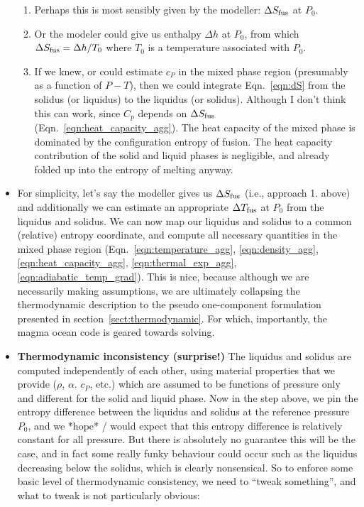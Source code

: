 \begin{itemize}
\begin{enumerate}
\item Perhaps this is most sensibly given by the modeller: $\Delta S_{\rm fus}$ at $P_0$.
\item Or the modeler could give us enthalpy $\Delta h$ at $P_0$, from which $\Delta S_{\rm fus} = \Delta h / T_0$ where $T_0$ is a temperature associated with $P_0$.
\item If we knew, or could estimate $c_P$ in the mixed phase region (presumably as a function of $P-T$), then we could integrate Eqn.~\ref{eqn:dS} from the solidus (or liquidus) to the liquidus (or solidus).  Although I don't think this can work, since $C_p$ depends on $\Delta S_{\rm fus}$ (Eqn.~\ref{eqn:heat_capacity_agg}).  The heat capacity of the mixed phase is dominated by the configuration entropy of fusion. The heat capacity contribution of the solid and liquid phases is negligible, and already folded up into the entropy of melting anyway.
\end{enumerate}
\item For simplicity, let's say the modeller gives us $\Delta S_{\rm fus}$ (i.e., approach 1. above) and additionally we can estimate an appropriate $\Delta T_{\rm fus}$ at $P_0$ from the liquidus and solidus.  We can now map our liquidus and solidus to a common (relative) entropy coordinate, and compute all necessary quantities in the mixed phase region (Eqn.~\ref{eqn:temperature_agg}, \ref{eqn:density_agg}, \ref{eqn:heat_capacity_agg}, \ref{eqn:thermal_exp_agg}, \ref{eqn:adiabatic_temp_grad}).  This is nice, because although we are necessarily making assumptions, we are ultimately collapsing the thermodynamic description to the pseudo one-component formulation presented in section~\ref{sect:thermodynamic}.  For which, importantly, the magma ocean code is geared towards solving.
\item \textbf{Thermodynamic inconsistency (surprise!)}
  The liquidus and solidus are computed independently of each other, using material properties that we provide ($\rho$, $\alpha$. $c_P$, etc.) which are assumed to be functions of pressure only and different for the solid and liquid phase.  Now in the step above, we pin the entropy difference between the liquidus and solidus at the reference pressure $P_0$, and we *hope* / would expect that this entropy difference is relatively constant for all pressure.  But there is absolutely no guarantee this will be the case, and in fact some really funky behaviour could occur such as the liquidus decreasing below the solidus, which is clearly nonsensical.  So to enforce some basic level of thermodynamic consistency, we need to ``tweak something'', and what to tweak is not particularly obvious:

\end{itemize}
